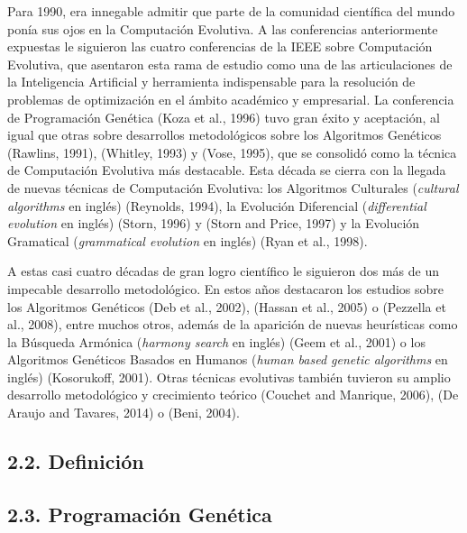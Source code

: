 \documentclass[spanish,a4paper,12pt,twoside]{report}
\begin{document}
  Para 1990, era innegable admitir que parte de la comunidad científica del mundo ponía sus ojos en la Computación Evolutiva. A las conferencias anteriormente expuestas le siguieron las cuatro conferencias de la IEEE sobre Computación Evolutiva, que asentaron esta rama de estudio como una de las articulaciones de la Inteligencia Artificial y herramienta indispensable para la resolución de problemas de optimización en el ámbito académico y empresarial. La conferencia de Programación Genética (Koza et al., 1996) tuvo gran éxito y aceptación, al igual que otras sobre desarrollos metodológicos sobre los Algoritmos Genéticos (Rawlins, 1991), (Whitley, 1993) y (Vose, 1995), que se consolidó como la técnica de Computación Evolutiva más destacable. Esta década se cierra con la llegada de nuevas técnicas de Computación Evolutiva: los Algoritmos Culturales (\emph{cultural algorithms} en inglés) (Reynolds, 1994), la Evolución Diferencial (\emph{differential evolution} en inglés) (Storn, 1996) y (Storn and Price, 1997) y la Evolución Gramatical (\emph{grammatical evolution} en inglés) (Ryan et al., 1998). \par
  A estas casi cuatro décadas de gran logro científico le siguieron dos más de un impecable desarrollo metodológico. En estos años destacaron los estudios sobre los Algoritmos Genéticos (Deb et al., 2002), (Hassan et al., 2005) o (Pezzella et al., 2008), entre muchos otros, además de la aparición de nuevas heurísticas como la Búsqueda Armónica (\emph{harmony search} en inglés) (Geem et al., 2001) o los Algoritmos Genéticos Basados en Humanos (\emph{human based genetic algorithms} en inglés) (Kosorukoff, 2001). Otras técnicas evolutivas también tuvieron su amplio desarrollo metodológico y crecimiento teórico (Couchet and Manrique, 2006), (De Araujo and Tavares, 2014) o (Beni, 2004).
  \section*{\Large 2.2. Definición}

  \section*{\Large 2.3. Programación Genética}
  
  \chapter{\vspace{-3cm}{\LARGE 3. Redes de Neuronas Artificiales}}
  
\end{document}
